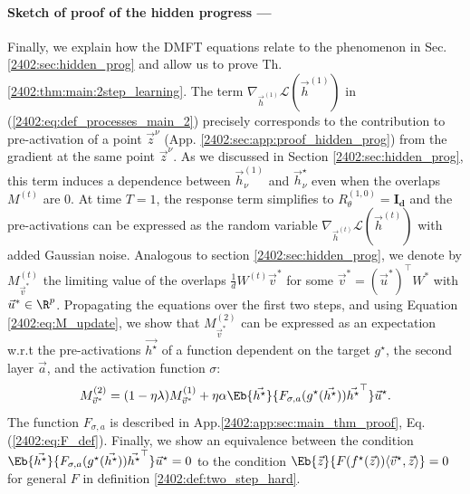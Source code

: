 \paragraph{Sketch of proof of the hidden progress ---} Finally, we explain how the DMFT equations relate to the phenomenon in Sec. \ref{2402:sec:hidden_prog} and allow us to prove Th. \ref{2402:thm:main:2step_learning}.
The term $\nabla_{\vec h^{(1)}}\mathcal{L}\left( \vec h^{(1)}\right)$ in (\ref{2402:eq:def_processes_main_2}) precisely corresponds to the contribution to pre-activation of a point $\vec{z}^\nu$ (App. \ref{2402:sec:app:proof_hidden_prog})
from the gradient at the same point $\vec{z}^\nu$. As we discussed in Section \ref{2402:sec:hidden_prog}, this term induces a dependence between $\vec h^{(1)}_\nu$ and $\vec h^\star_\nu$ even when the overlaps $M^{(t)}$ are $0$. At time $T=1$, the response term simplifies to $R_\theta^{(1,0)}=\mathbf{I_d}$ and the pre-activations can be expressed as the random variable $\nabla_{\vec h^{(t)}}\mathcal{L}\left( \vec h^{(t)}\right)$ with added Gaussian noise.
Analogous to section \ref{2402:sec:hidden_prog}, we denote by $M_{\vec{v}^*}^{(t)}$ the limiting value of the overlaps $\frac{1}{d}W^{(t)}\vec{v}^*$ for some $\vec{v}^* = (\vec{u}^*)^\top W^*$ with $\vec{u}^* \in \R^p$.
Propagating the equations over the first two steps, and using Equation \eqref{2402:eq:M_update}, we show that $M_{\vec{v}^*}^{(2)}$ can be expressed as an expectation w.r.t the pre-activations $\vec{h^\star}$ of a function dependent on the target $g^\star$, the second layer $\vec{a}$, and the activation function $\sigma$:
\begin{equation}\label{2402:eq:overlap_}
    M_{\vec{v}^*}^{(2)}  =  (1  -  \eta\lambda) M_{\vec{v}^*}^{(1)} + \eta \alpha \Eb{\vec{h^\star}}{F_{\sigma, a}(g^\star(\vec{h^\star}))\vec{h^\star}^\top}\vec{u}^\star .
\end{equation} 
The function $F_{\sigma, a}$ is described in App.\ref{2402:app:sec:main_thm_proof},  Eq.(\ref{2402:eq:F_def}).  Finally, we show an equivalence between the condition $\Eb{\vec{h^\star}}{F_{\sigma, a}(g^\star(\vec{h^\star}))\vec{h^\star}^\top}\vec{u}^\star = 0$ to the condition $\Eb{\vec{z}}{F(f^\star(\vec{z}))\langle \vec{v}^\star, \vec{z}\rangle}=0$ for general $F$ in definition \ref{2402:def:two_step_hard}.


